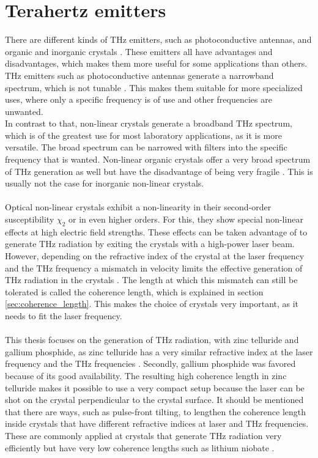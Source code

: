\section{Terahertz emitters}
\label{sec:emitters}
There are different kinds of $\si{\tera\hertz}$ emitters, such as photoconductive antennas, and organic and inorganic crystals \cite{Tutorial}.
These emitters all have advantages and disadvantages, which makes them more useful for some applications than others.
$\si{\tera\hertz}$ emitters such as photoconductive antennas generate a narrowband spectrum, which is not tunable \cite{PCA_bandwidth}.
This makes them suitable for more specialized uses, where only a specific frequency is of use and other frequencies are unwanted.
\\
In contrast to that, non-linear crystals generate a broadband $\si{\tera\hertz}$ spectrum, which is of the greatest use for most laboratory applications, as it is more versatile.
The broad spectrum can be narrowed with filters into the specific frequency that is wanted.
Non-linear organic crystals offer a very broad spectrum of $\si{\tera\hertz}$ generation as well but have the disadvantage of being very fragile \cite{organic_crystals}.
This is usually not the case for inorganic non-linear crystals.
\\\\
Optical non-linear crystals exhibit a non-linearity in their second-order susceptibility $\chi_2$ or in even higher orders.
For this, they show special non-linear effects at high electric field strengths.
These effects can be taken advantage of to generate $\si{\tera\hertz}$ radiation by exiting the crystals with a high-power laser beam.
\\
However, depending on the refractive index of the crystal at the laser frequency and the $\si{\tera\hertz}$ frequency a mismatch in velocity limits the effective generation of $\si{\tera\hertz}$ radiation in the crystals \cite{coherence_legnth}.
The length at which this mismatch can still be tolerated is called the coherence length, which is explained in section \ref{sec:coherence_length}.
This makes the choice of crystals very important, as it needs to fit the laser frequency.
\\\\
This thesis focuses on the generation of $\si{\tera\hertz}$ radiation, with zinc telluride and gallium phosphide, as zinc telluride has a very similar refractive index at the laser frequency and the $\si{\tera\hertz}$ frequencies \cite{coherence_legnth}.
Secondly, gallium phosphide was favored because of its good availability.
The resulting high coherence length in zinc telluride makes it possible to use a very compact setup because the laser can be shot on the crystal perpendicular to the crystal surface.
It should be mentioned that there are ways, such as pulse-front tilting, to lengthen the coherence length inside crystals that have different refractive indices at laser and $\si{\tera\hertz}$ frequencies.
These are commonly applied at crystals that generate $\si{\tera\hertz}$ radiation very efficiently but have very low coherence lengths such as lithium niobate \cite{pulsefront_tilting}.
